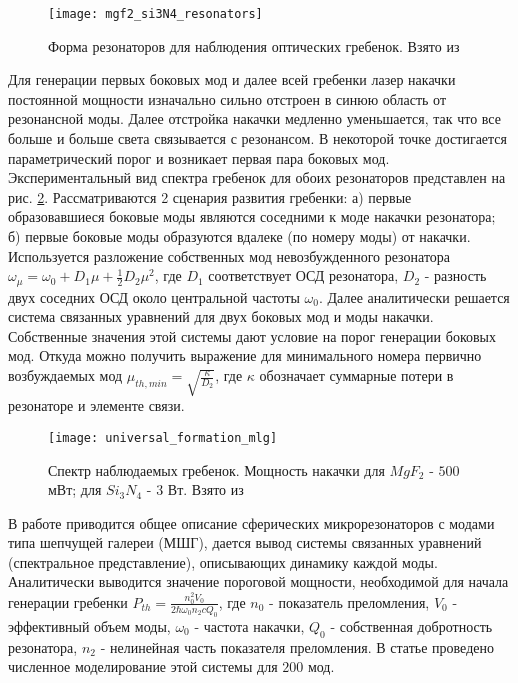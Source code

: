 \begin{figure}
  \centering
  \texttt{[image: mgf2\_si3N4\_resonators]}
  \caption{Форма резонаторов для наблюдения оптических гребенок. Взято из \cite{MLG_nature_2012}}
  \label{mgf2_si3N4_resonators}
\end{figure}
Для генерации первых боковых мод и далее всей гребенки лазер накачки постоянной мощности изначально сильно отстроен в синюю область от резонансной моды. Далее отстройка накачки медленно уменьшается, так что все больше и больше света связывается с резонансом. В некоторой точке достигается параметрический порог и возникает первая пара боковых мод. Экспериментальный вид спектра гребенок для обоих резонаторов представлен на рис. \ref{universal_formation_mlg}. Рассматриваются 2 сценария развития гребенки: а) первые образовавшиеся боковые моды являются соседними к моде накачки резонатора; б) первые боковые моды образуются вдалеке (по номеру моды) от накачки. Используется разложение собственных мод невозбужденного резонатора $\omega_\mu=\omega_0+D_1\mu+\frac{1}{2}D_2\mu^2$, где $D_1$ соответствует ОСД резонатора, $D_2$ - разность двух соседних ОСД около центральной частоты $\omega_0$. Далее аналитически решается система связанных уравнений для двух боковых мод и моды накачки. Собственные значения этой системы дают условие на порог генерации боковых мод. Откуда можно получить выражение для минимального номера первично возбуждаемых мод $\mu_{th,min}=\sqrt{\frac{\kappa}{D_2}}$, где $\kappa$ обозначает суммарные потери в резонаторе и элементе связи.
\begin{figure}
  \centering
  \texttt{[image: universal\_formation\_mlg]}
  \caption{Спектр наблюдаемых гребенок. Мощность накачки для $MgF_2$ - $500$ мВт; для $Si_3N_4$ - $3$ Вт. Взято из \cite{MLG_nature_2012}}
  \label{universal_formation_mlg}
\end{figure}

В работе \cite{Chembo_modal} приводится общее описание сферических микрорезонаторов с модами типа шепчущей галереи (МШГ), дается вывод системы связанных уравнений (спектральное представление), описывающих динамику каждой моды. Аналитически выводится значение пороговой мощности, необходимой для начала генерации гребенки $P_{th}=\frac{n_0^2 V_0}{2\hbar\omega_0 n_2 c Q_0}$, где $n_0$ - показатель преломления, $V_0$ - эффективный объем моды, $\omega_0$ - частота накачки, $Q_0$ - собственная добротность резонатора, $n_2$ - нелинейная часть показателя преломления. В статье проведено численное моделирование этой системы для $200$ мод.

